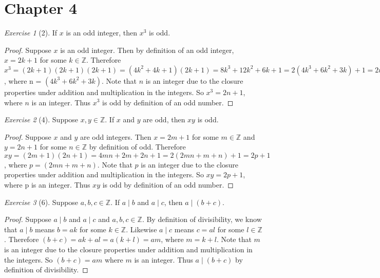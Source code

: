 \documentclass[12pt]{amsart}
\theoremstyle{remark}
\newtheorem*{exercise}{Exercise}%
\def\ZZ{\ensuremath{\mathbb Z}}
\theoremstyle{mycomment}
\begin{document}
\thispagestyle{fancy}

\section*{Chapter 4} \doublespace
\begin{exercise}[2] If $x$ is an odd integer, then $x^{3}$ is odd.
\begin{proof}
Suppose $x$ is an odd integer. Then by definition of an odd integer, $x = 2k + 1$ for some $k \in \ZZ$. Therefore $x^3 = (2k+1)(2k+1)(2k+1) = (4k^2 + 4k +1)(2k+1) = 8k^3 + 12k^2 + 6k + 1 = 2(4k^3+6k^2 + 3k) + 1  = 2n + 1$, where n = $(4k^3 + 6k^2 + 3k)$. Note that $n$ is an integer due to the closure properties under addition and multiplication in the integers. So $x^3 = 2n+1$, where $n$ is an integer. Thus $x^3$ is odd by definition of an odd number.
\end{proof}
\end{exercise} 

\begin{exercise}[4] Suppose $x,y\in\mathbb Z$. If $x$ and $y$ are odd, then $xy$ is odd.
\begin{proof} 
Suppose $x$ and $y$ are odd integers. Then $x = 2m+1$ for some $m \in \ZZ$ and $y = 2n+1$ for some $n \in \ZZ$ by definition of odd. Therefore $xy = (2m+1)(2n+1) = 4mn + 2m + 2n + 1 = 2(2mn + m + n) + 1 = 2p+1$, where $p = (2mn + m + n)$. Note that $p$ is an integer due to the closure properties under addition and multiplication in the integers. So $xy = 2p + 1$, where p is an integer. Thus $xy$ is odd by definition of an odd number. 
\end{proof}
\end{exercise}


\begin{exercise}[6] Suppose $a,b,c\in\ZZ$. If $a\mid b$ and $a\mid c$, then $a\mid (b+c)$. %
\begin{proof}
Suppose $a \mid b$ and $a \mid c$ and $a,b,c \in \ZZ$. By definition of divisibility, we know that $a \mid b$ means $ b = ak$ for some $k \in \ZZ$. Likewise  $a \mid c$ means $c = al$ for some $l \in \ZZ$. Therefore $(b + c) = ak + al = a(k + l) = am$, where $m = k + l$. Note that $m$ is an integer due to the closure properties under addition and multiplication in the integers. So $(b + c) = am$ where $m$ is an integer. Thus $a \mid (b + c)$ by definition of divisibility. 
\end{proof}
\end{exercise}
\end{document}
